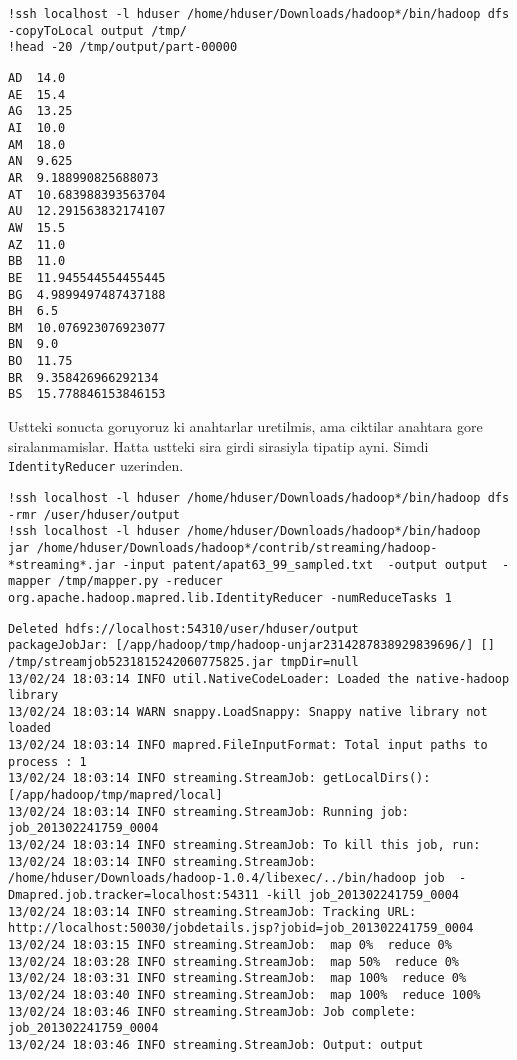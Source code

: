 \documentclass[12pt,fleqn]{article}\usepackage{../common}
\begin{document}
\begin{verbatim}
!ssh localhost -l hduser /home/hduser/Downloads/hadoop*/bin/hadoop dfs  -copyToLocal output /tmp/
!head -20 /tmp/output/part-00000
\end{verbatim}

\begin{verbatim}
AD	14.0
AE	15.4
AG	13.25
AI	10.0
AM	18.0
AN	9.625
AR	9.188990825688073
AT	10.683988393563704
AU	12.291563832174107
AW	15.5
AZ	11.0
BB	11.0
BE	11.945544554455445
BG	4.9899497487437188
BH	6.5
BM	10.076923076923077
BN	9.0
BO	11.75
BR	9.358426966292134
BS	15.778846153846153
\end{verbatim}

Ustteki sonucta goruyoruz ki anahtarlar uretilmis, ama ciktilar
anahtara gore siralanmamislar. Hatta ustteki sira girdi sirasiyla
tipatip ayni. Simdi \verb!IdentityReducer! uzerinden.

\begin{verbatim}
!ssh localhost -l hduser /home/hduser/Downloads/hadoop*/bin/hadoop dfs -rmr /user/hduser/output
!ssh localhost -l hduser /home/hduser/Downloads/hadoop*/bin/hadoop  jar /home/hduser/Downloads/hadoop*/contrib/streaming/hadoop-*streaming*.jar -input patent/apat63_99_sampled.txt  -output output  -mapper /tmp/mapper.py -reducer org.apache.hadoop.mapred.lib.IdentityReducer -numReduceTasks 1 
\end{verbatim}

\begin{verbatim}
Deleted hdfs://localhost:54310/user/hduser/output
packageJobJar: [/app/hadoop/tmp/hadoop-unjar2314287838929839696/] [] /tmp/streamjob5231815242060775825.jar tmpDir=null
13/02/24 18:03:14 INFO util.NativeCodeLoader: Loaded the native-hadoop library
13/02/24 18:03:14 WARN snappy.LoadSnappy: Snappy native library not loaded
13/02/24 18:03:14 INFO mapred.FileInputFormat: Total input paths to process : 1
13/02/24 18:03:14 INFO streaming.StreamJob: getLocalDirs(): [/app/hadoop/tmp/mapred/local]
13/02/24 18:03:14 INFO streaming.StreamJob: Running job: job_201302241759_0004
13/02/24 18:03:14 INFO streaming.StreamJob: To kill this job, run:
13/02/24 18:03:14 INFO streaming.StreamJob: /home/hduser/Downloads/hadoop-1.0.4/libexec/../bin/hadoop job  -Dmapred.job.tracker=localhost:54311 -kill job_201302241759_0004
13/02/24 18:03:14 INFO streaming.StreamJob: Tracking URL: http://localhost:50030/jobdetails.jsp?jobid=job_201302241759_0004
13/02/24 18:03:15 INFO streaming.StreamJob:  map 0%  reduce 0%
13/02/24 18:03:28 INFO streaming.StreamJob:  map 50%  reduce 0%
13/02/24 18:03:31 INFO streaming.StreamJob:  map 100%  reduce 0%
13/02/24 18:03:40 INFO streaming.StreamJob:  map 100%  reduce 100%
13/02/24 18:03:46 INFO streaming.StreamJob: Job complete: job_201302241759_0004
13/02/24 18:03:46 INFO streaming.StreamJob: Output: output
\end{verbatim}
\end{document}
